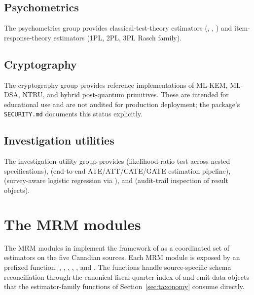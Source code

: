 \documentclass[article,shortnames,nojss]{jss}
\begin{document}
\subsection{Psychometrics}

The psychometrics group provides classical-test-theory estimators
(, ,
) and item-response-theory estimators
(1PL, 2PL, 3PL Rasch family).

\subsection{Cryptography}

The cryptography group provides reference implementations of
ML-KEM, ML-DSA, NTRU, and hybrid post-quantum primitives. These
are intended for educational use and are not audited for
production deployment; the package's \texttt{SECURITY.md}
documents this status explicitly.

\subsection{Investigation utilities}

The investigation-utility group provides
 (likelihood-ratio test
across nested specifications),
 (end-to-end
ATE/ATT/CATE/GATE estimation pipeline),
 (survey-aware logistic
regression via ), and 
(audit-trail inspection of result objects).

\section{The MRM modules}
\label{sec:mrm}

The MRM modules in  implement the framework of
\citet{Ruhela2026MRM} as a coordinated set of estimators on the
five Canadian sources. Each MRM module is exposed by an
 prefixed function: ,
, ,
, , and
. The functions handle source-specific
schema reconciliation through the canonical fiscal-quarter index
of \citet{Ruhela2026MRM} and emit data objects that the
estimator-family functions of Section~\ref{sec:taxonomy} consume
directly.
\end{document}
